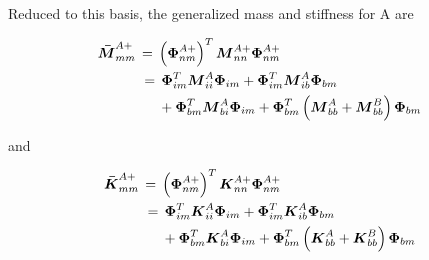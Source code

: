 \documentclass[10pt,openany,twoside]{book}
\numberwithin{equation}{section}   %
\newcommand{\Matrix}[1]{\boldsymbol{#1}}
\begin{document}
Reduced to this basis, the generalized mass and stiffness for A are

\begin{equation}
\begin{split}
\Matrix{\bar{M}}_{mm}^{A+} \, & = \,
        \left( \Matrix{\Phi}_{nm}^{A+} \right)^T
                \Matrix{M}_{nn}^{A+} \Matrix{\Phi}_{nm}^{A+} \\
        & \, = \, \Matrix{\Phi}_{im}^T \Matrix{M}_{ii}^A \Matrix{\Phi}_{im}
                + \Matrix{\Phi}_{im}^T \Matrix{M}_{ib}^A \Matrix{\Phi}_{bm} \\
         & \mbox{\hspace{0.2in}} +
                        \Matrix{\Phi}_{bm}^T \Matrix{M}_{bi}^A \Matrix{\Phi}_{im} +
                        \Matrix{\Phi}_{bm}^T \left(\Matrix{M}_{bb}^A +
                        \Matrix{M}_{bb}^B \right) \Matrix{\Phi}_{bm}
\end{split}
\end{equation}


and

\begin{equation}
\begin{split}
\Matrix{\bar{K}}_{mm}^{A+} \, & = \,
                        \left( \Matrix{\Phi}_{nm}^{A+} \right)^T
                        \Matrix{K}_{nn}^{A+} \Matrix{\Phi}_{nm}^{A+} \\
        & \, = \, \Matrix{\Phi}_{im}^T \Matrix{K}_{ii}^A \Matrix{\Phi}_{im} +
                        \Matrix{\Phi}_{im}^T \Matrix{K}_{ib}^A \Matrix{\Phi}_{bm} \\
        & \mbox{\hspace{0.2in}} +
                \Matrix{\Phi}_{bm}^T \Matrix{K}_{bi}^A \Matrix{\Phi}_{im} +
                \Matrix{\Phi}_{bm}^T \left(\Matrix{K}_{bb}^A +
                \Matrix{K}_{bb}^B \right) \Matrix{\Phi}_{bm}
\end{split}
\end{equation}
\end{document}
